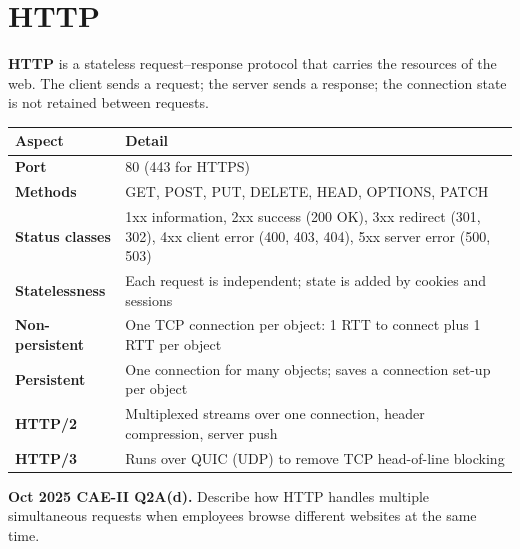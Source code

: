 \documentclass[11pt,a4paper]{article}
\begin{document}
\section{HTTP}

\textbf{HTTP} is a stateless request--response protocol that carries the resources of the web. The client sends a request; the server sends a response; the connection state is not retained between requests.

\begin{center}\small
\begin{tabularx}{\textwidth}{>{\bfseries}p{} X}
\toprule Aspect & Detail\\
\midrule
Port & 80 (443 for HTTPS)\\
Methods & GET, POST, PUT, DELETE, HEAD, OPTIONS, PATCH\\
Status classes & 1xx information, 2xx success (200 OK), 3xx redirect (301, 302), 4xx client error (400, 403, 404), 5xx server error (500, 503)\\
Statelessness & Each request is independent; state is added by cookies and sessions\\
Non-persistent & One TCP connection per object: 1 RTT to connect plus 1 RTT per object\\
Persistent & One connection for many objects; saves a connection set-up per object\\
HTTP/2 & Multiplexed streams over one connection, header compression, server push\\
HTTP/3 & Runs over QUIC (UDP) to remove TCP head-of-line blocking\\
\bottomrule
\end{tabularx}
\end{center}

\begin{pyqbox}
\textbf{Oct 2025 CAE-II Q2A(d).} Describe how HTTP handles multiple simultaneous requests when employees browse different websites at the same time.
\end{pyqbox}
\end{document}

